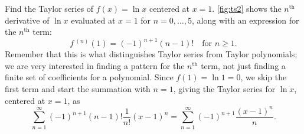 \begin{example}[The Taylor series of $f(x)=\ln x$ at $x=1$]\label{ex_ts2}%
Find the Taylor series of $f(x) = \ln x$ centered at $x=1$.
\solution
\autoref{fig:ts2} shows the $n^\text{th}$ derivative of $\ln x$ evaluated at $x=1$ for $n=0,\dotsc,5$, along with an expression for the $n^\text{th}$ term:
\[f\,^{(n)}(1) = (-1)^{n+1}(n-1)!\quad \text{for $n\geq 1$.}\]
Remember that this is what distinguishes Taylor series from Taylor polynomials; we are very interested in finding a pattern for the $n^\text{th}$ term, not just finding a finite set of coefficients for a polynomial.
Since $f(1) = \ln 1 = 0$, we skip the first term and start the summation with $n=1$, giving the Taylor series for $\ln x$, centered at $x=1$, as 
\[\sum_{n=1}^\infty (-1)^{n+1}(n-1)!\frac{1}{n!}(x-1)^n = \sum_{n=1}^\infty (-1)^{n+1}\frac{(x-1)^n}{n}.\]
\end{example}


